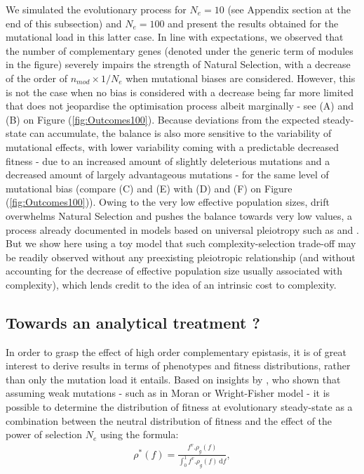 We simulated the evolutionary process for $N_e=10$ (see Appendix section at the end of this subsection) and $N_e=100$ and present the results obtained for the mutational load in this latter case. In line with expectations, we observed that the number of complementary genes (denoted under the generic term of modules in the figure) severely impairs the strength of Natural Selection, with a decrease of the order of $n_{mod}\times 1/N_e$ when mutational biases are considered. However, this is not the case when no bias is considered with a decrease being far more limited that does not jeopardise the optimisation process albeit marginally - see (A) and (B) on Figure (\ref{fig:Outcomes100}). Because deviations from the expected steady-state can accumulate, the balance is also more sensitive to the variability of mutational effects, with lower variability coming with a predictable decreased fitness - due to an increased amount of slightly deleterious mutations and a decreased amount of largely advantageous mutations - for the same level of mutational bias (compare (C) and (E) with (D) and (F) on Figure (\ref{fig:Outcomes100})). Owing to the very low effective population sizes, drift overwhelms Natural Selection and pushes the balance towards very low values, a process already documented in models based on universal pleiotropy such as \citep{Hartl96} and \citep{Poon00}. But we show here using a toy model that such complexity-selection trade-off may be readily observed without any preexisting pleiotropic relationship (and without accounting for the decrease of effective population size usually associated with complexity), which lends credit to the idea of an intrinsic cost to complexity.

\subsection{Towards an analytical treatment ?}

In order to grasp the effect of high order complementary epistasis, it is of great interest to derive results in terms of phenotypes and fitness distributions, rather than only the mutation load it entails. Based on insights by \citep{Sella05}, who shown that assuming weak mutations - such as in Moran or Wright-Fisher model - it is possible to determine the distribution of fitness at evolutionary steady-state as a combination between the neutral distribution of fitness and the effect of the power of selection $N_e$ using the formula:
\begin{align}
 \rho^*(f)   = \frac{f^v.\rho_g(f)}{ \int_{0}^{1} f^v.\rho_g(f) \, \mathrm{d}f }, 
\end{align}

